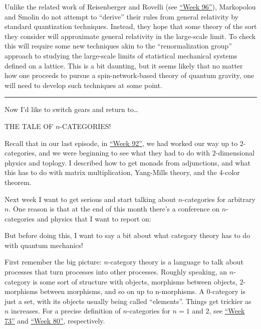 \documentclass{article}
\def\tightlist{}
\renewcommand{\texttt}[1]{%
  \begingroup
  \ttfamily
  \begingroup\lccode`~=`/\lowercase{\endgroup\def~}{/\discretionary{}{}{}}%
  \begingroup\lccode`~=`[\lowercase{\endgroup\def~}{[\discretionary{}{}{}}%
  \begingroup\lccode`~=`.\lowercase{\endgroup\def~}{.\discretionary{}{}{}}%
  \catcode`/=\active\catcode`[=\active\catcode`.=\active
  \scantokens{#1\noexpand}%
  \endgroup
}
\begin{document}
Unlike the related work of Reisenberger and Rovelli (see
\protect\hyperlink{week96}{``Week 96''}), Markopolou and Smolin do not
attempt to ``derive'' their rules from general relativity by standard
quantization techniques. Instead, they hope that some theory of the sort
they consider will approximate general relativity in the large-scale
limit. To check this will require some new techniques akin to the
``renormalization group'' approach to studying the large-scale limits of
statistical mechanical systems defined on a lattice. This is a bit
daunting, but it seems likely that no matter how one proceeds to pursue
a spin-network-based theory of quantum gravity, one will need to develop
such techniques at some point.

\begin{center}\rule{0.5\linewidth}{0.5pt}\end{center}

Now I'd like to switch gears and return to\ldots{}

THE TALE OF \(n\)-CATEGORIES!

Recall that in our last episode, in \protect\hyperlink{week92}{``Week
92''}, we had worked our way up to \(2\)-categories, and we were
beginning to see what they had to do with \(2\)-dimensional physics and
toplogy. I described how to get monads from adjunctions, and what this
has to do with matrix multiplication, Yang-Mills theory, and the 4-color
theorem.

Next week I want to get serious and start talking about \(n\)-categories
for arbitrary \(n\). One reason is that at the end of this month there's
a conference on \(n\)-categories and physics that I want to report on:


But before doing this, I want to say a bit about what category theory
has to do with quantum mechanics!

First remember the big picture: \(n\)-category theory is a language to
talk about processes that turn processes into other processes. Roughly
speaking, an \(n\)-category is some sort of structure with objects,
morphisms between objects, \(2\)-morphisms between morphisms, and so on
up to n-morphisms. A 0-category is just a set, with its objects usually
being called ``elements''. Things get trickier as \(n\) increases. For a
precise definition of \(n\)-categories for \(n = 1\) and \(2\), see
\protect\hyperlink{week73}{``Week 73''} and
\protect\hyperlink{week80}{``Week 80''}, respectively.
\end{document}

